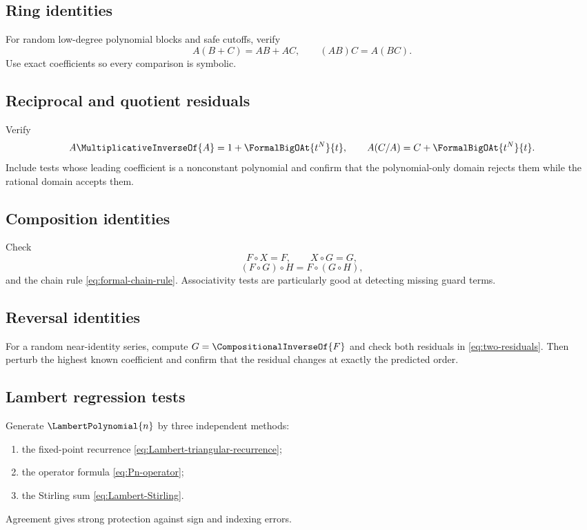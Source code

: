 \documentclass[11pt,openany]{book}
\theoremstyle{definition}
\theoremstyle{plain}
\theoremstyle{remark}
\newcommand{\rev}[1]{\CompositionalInverseOf{#1}}
\newcommand{\recip}[1]{\MultiplicativeInverseOf{#1}}
\newcommand{\compose}{\mathbin{\circ}}
\begin{document}
\subsection{Ring identities}
For random low-degree polynomial blocks and safe cutoffs, verify
\[
 A(B+C)=AB+AC,
 \qquad
 (AB)C=A(BC).
\]
Use exact coefficients so every comparison is symbolic.

\subsection{Reciprocal and quotient residuals}
Verify
\[
 A\recip{A}=1+\FormalBigOAt{t^N}{t},
 \qquad
 A(C/A)=C+\FormalBigOAt{t^N}{t}.
\]
Include tests whose leading coefficient is a nonconstant polynomial and confirm
that the polynomial-only domain rejects them while the rational domain accepts
them.

\subsection{Composition identities}
Check
\[
 F\compose X=F,
 \qquad
 X\compose G=G,
\]
\[
 (F\compose G)\compose H=F\compose(G\compose H),
\]
and the chain rule \cref{eq:formal-chain-rule}.  Associativity tests are
particularly good at detecting missing guard terms.

\subsection{Reversal identities}
For a random near-identity series, compute \(G=\rev F\) and check both residuals
in \cref{eq:two-residuals}.  Then perturb the highest known coefficient and
confirm that the residual changes at exactly the predicted order.

\subsection{Lambert regression tests}
Generate \(\LambertPolynomial{n}\) by three independent methods:
\begin{enumerate}
\item the fixed-point recurrence \cref{eq:Lambert-triangular-recurrence};
\item the operator formula \cref{eq:Pn-operator};
\item the Stirling sum \cref{eq:Lambert-Stirling}.
\end{enumerate}
Agreement gives strong protection against sign and indexing errors.
\end{document}
